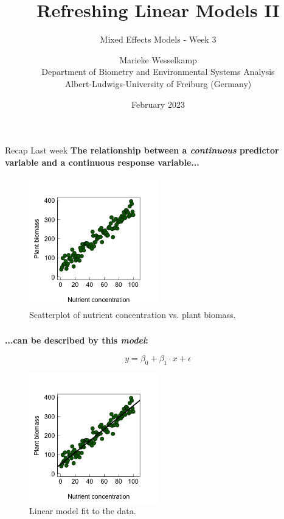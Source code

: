 \documentclass{beamer}
\title{Refreshing Linear Models II}
\subtitle{Mixed Effects Models - Week 3}
\author{Marieke Wesselkamp \\ Department of Biometry and Environmental Systems Analysis \\ Albert-Ludwigs-University of Freiburg (Germany)}
\date{February 2023}
\begin{document}
\begin{frame}
  \titlepage
\end{frame}

\begin{frame}{Recap Last week}
  \textbf{The relationship between a \textit{continuous} predictor variable and a continuous response variable...}
  
  \begin{figure}[h]
    \centering
    \includegraphics[width=0.5\textwidth]{lectures/day_3_LM_refresh_II/figures/unnamed-chunk-2-1.png} 
    \caption{Scatterplot of nutrient concentration vs. plant biomass.}
  \end{figure}
\end{frame}

\begin{frame}
  \frametitle{}
  \textbf{...can be described by this \textit{model}:}
  
  \begin{equation*}
  y = \beta_0 + \beta_1 \cdot x + \epsilon
  \end{equation*}
  
  \begin{figure}[h]
    \centering
    \includegraphics[width=0.5\textwidth]{lectures/day_3_LM_refresh_II/figures/unnamed-chunk-3-1.png} 
    \caption{Linear model fit to the data.}
  \end{figure}
\end{frame}
\end{document}

